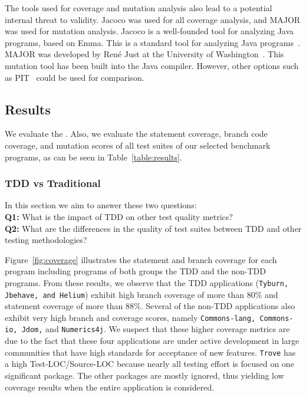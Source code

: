 \documentclass[conference]{IEEEtran}
\begin{document}
The tools used for coverage and mutation analysis also lead to a potential internal threat to validity.  Jacoco was used for all coverage analysis, and MAJOR was used for mutation analysis.  Jacoco is a well-founded tool for analyzing Java programs, based on Emma.  This is a standard tool for analyzing Java programs~\cite{jacoco:2014}.  MAJOR was developed by Ren\'{e} Just at the University of Washington~\cite{just2011using}.  This mutation tool has been built into the Java compiler. However, other options such as PIT~\cite{pitest:2014} could be used for comparison. 

\subsection{Results}
We evaluate the  . Also, we evaluate the statement coverage, branch code coverage, and mutation scores of all test suites of our selected benchmark programs, as can be seen in Table~\ref{table:results}.
  
\subsubsection{TDD vs Traditional}
In this section we aim to answer these two questions:\\
\textbf{Q1:} What is the impact of TDD on other test quality metrics?\\
\textbf{Q2:} What are the differences in the quality of test suites between TDD and other testing methodologies?

Figure~\ref{fig:coverage} illustrates the statement and branch coverage for each program including programs of both groups the TDD and the non-TDD programs. From these results, we observe that the TDD applications (\texttt{Tyburn, Jbehave, and Helium}) exhibit high branch coverage of more than 80\% and statement coverage of more than 88\%.  Several of the non-TDD applications also exhibit very high branch and coverage scores, namely \texttt{Commons-lang, Commons-io, Jdom,} and \texttt{Numerics4j}.  We suspect that these higher coverage metrics are due to the fact that these four applications are under active development in large communities that have high standards for acceptance of new features.  \texttt{Trove} has a high Test-LOC/Source-LOC because nearly all testing effort is focused on one significant package.  The other packages are mostly ignored, thus yielding low coverage results when the entire application is considered.  %
\end{document}
